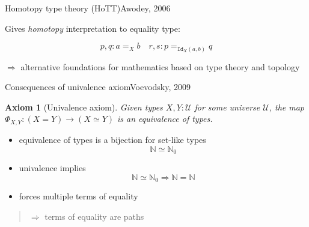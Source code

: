 \documentclass[english]{beamer}
\newtheorem{axiom}[theorem]{Axiom}
\begin{document}
\begin{frame}{Homotopy type theory (HoTT)}{Awodey, 2006}

Gives \emph{homotopy} interpretation to equality type:

\centering
$$ p,q : a =_X b \quad r,s : p =_{\texttt{Id}_X(a,b)} q$$ 




$\Rightarrow$ alternative foundations for mathematics based on type theory and topology

\end{frame}






\begin{frame}{Consequences of univalence axiom}{Voevodsky, 2009}

\begin{axiom}[Univalence axiom] 
 Given types $X,Y : \mathcal{U}$ for some universe $\mathcal{U}$, the map \(\Phi_{X,Y}: (X=Y) \rightarrow (X \simeq Y)\) is an equivalence of types. 
\end{axiom}

\begin{itemize}
    \item equivalence of types is a bijection for set-like types \[\mathbb{N} \simeq \mathbb{N}_0 \]
    \item univalence implies \[\mathbb{N} \simeq \mathbb{N}_0 \Rightarrow \mathbb{N} = \mathbb{N}\]

    \item forces multiple terms of equality
\end{itemize}

\pause
\begin{quotation}
$\Rightarrow$ terms of equality are paths
\end{quotation}




\end{frame}
\end{document}

